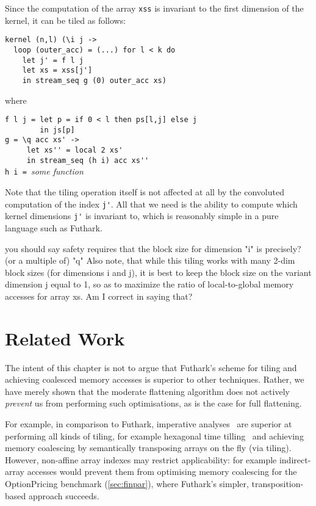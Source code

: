 Since the computation of the array \texttt{xss} is invariant to the
first dimension of the kernel, it can be tiled as follows:

\begin{lstlisting}
kernel (n,l) (\i j ->
  loop (outer_acc) = (...) for l < k do
    let j' = f l j
    let xs = xss[j']
    in stream_seq g (0) outer_acc xs)
\end{lstlisting}
\begin{minipage}[t]{0.1\linewidth}
  \begin{flushright}
    where
  \end{flushright}
\end{minipage}
\begin{minipage}[t]{0.8\linewidth}
\lstinline{f l j = let p = if 0 < l then ps[l,j] else j}\\
\lstinline{        in js[p]}\\
\lstinline{g = \q acc xs' ->}\\
\lstinline{     let xs'' = local 2 xs'}\\
\lstinline{     in stream_seq (h i) acc xs''}\\
\lstinline{h i = }\textit{some function}
\end{minipage}
\vspace{1em}

Note that the tiling operation itself is not affected at all by the
convoluted computation of the index \lstinline{j'}.  All that we need
is the ability to compute which kernel dimensions \lstinline{j'} is
invariant to, which is reasonably simple in a pure language such as
Futhark.

you should say safety requires that the block size for
dimension "i"
is precisely? (or a multiple of) "q"
Also note, that while this tiling works with many 2-dim block sizes
(for dimensions i and j), it is best to keep the block size on the variant
dimension j equal to 1, so as to maximize the ratio of local-to-global
memory accesses for array xs.
Am I correct in saying that?

\section{Related Work}

The intent of this chapter is not to argue that Futhark's scheme for
tiling and achieving coalesced memory accesses is superior to other
techniques.  Rather, we have merely shown that the moderate flattening
algorithm does not actively \textit{prevent} us from performing such
optimisations, as is the case for full flattening.

For example, in comparison to Futhark, imperative
analyses~\cite{InformalTiling,PolyPluto2} are superior at performing
all kinds of tiling, for example hexagonal time
tilling~\cite{HexaTiling} and achieving memory coalescing by
semantically transposing arrays on the fly (via tiling).
%
However, non-affine array indexes may restrict applicability: for
example indirect-array accesses would prevent them from optimising
memory coalescing for the OptionPricing benchmark (\cref{sec:finpar}),
where Futhark's simpler, transposition-based approach succeeds.

